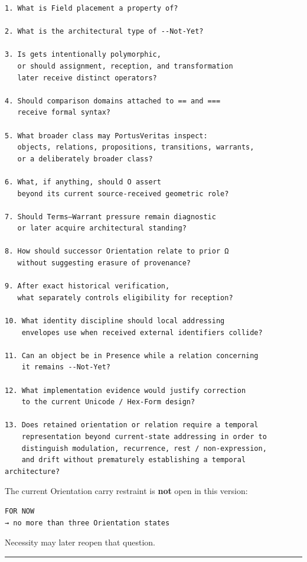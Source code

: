 \begin{verbatim}
1. What is Field placement a property of?

2. What is the architectural type of --Not-Yet?

3. Is gets intentionally polymorphic,
   or should assignment, reception, and transformation
   later receive distinct operators?

4. Should comparison domains attached to == and ===
   receive formal syntax?

5. What broader class may PortusVeritas inspect:
   objects, relations, propositions, transitions, warrants,
   or a deliberately broader class?

6. What, if anything, should O assert
   beyond its current source-received geometric role?

7. Should Terms–Warrant pressure remain diagnostic
   or later acquire architectural standing?

8. How should successor Orientation relate to prior Ω
   without suggesting erasure of provenance?

9. After exact historical verification,
   what separately controls eligibility for reception?

10. What identity discipline should local addressing
    envelopes use when received external identifiers collide?

11. Can an object be in Presence while a relation concerning
    it remains --Not-Yet?

12. What implementation evidence would justify correction
    to the current Unicode / Hex-Form design?

13. Does retained orientation or relation require a temporal
    representation beyond current-state addressing in order to
    distinguish modulation, recurrence, rest / non-expression,
    and drift without prematurely establishing a temporal architecture?
\end{verbatim}

The current Orientation carry restraint is \textbf{not} open in this
version:

\begin{verbatim}
FOR NOW
→ no more than three Orientation states
\end{verbatim}

Necessity may later reopen that question.

\begin{center}\rule{0.5\linewidth}{0.5pt}\end{center}


